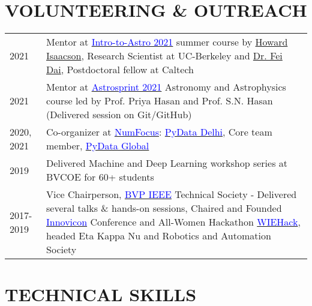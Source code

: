 \documentclass[11pt]{res} %
\begin{document}
\begin{resume}

\section{VOLUNTEERING \& OUTREACH}
\vspace{0.15in}
\begin{table}[h]
\begin{tabular}{p{0.8in} p{5.5in}}
    2021 & Mentor at \href{https://github.com/howardisaacson/Intro-to-Astro-2021}{\textcolor{blue}{Intro-to-Astro 2021}} summer course by \textcolor{blue}{\href{https://astro.berkeley.edu/people/howard-isaacson/}{Howard Isaacson}}, Research Scientist at UC-Berkeley and \textcolor{blue}{\href{https://sites.astro.caltech.edu/~fdai/}{Dr. Fei Dai}}, Postdoctoral fellow at Caltech \\
    
    2021 & Mentor at \href{https://www.astrosprint2021.com/}{\textcolor{blue}{Astrosprint 2021}} Astronomy and Astrophysics course led
    by Prof. Priya Hasan and Prof. S.N. Hasan (Delivered session on Git/GitHub) \\
    
    2020, 2021 & Co-organizer at \href{https://numfocus.org/}{\textcolor{blue}{NumFocus}}: \href{https://pydata.org/}{\textcolor{blue}{PyData Delhi}}, Core team member, \href{https://global.pydata.org}{\textcolor{blue}{PyData Global}} \\
    
    2019 & Delivered Machine and Deep Learning workshop series at BVCOE for 60+ students\\
    
    2017-2019 & Vice Chairperson, \href{https://bvpieee.com/}{\textcolor{blue}{BVP IEEE}} Technical Society - Delivered several talks \& hands-on sessions, Chaired and Founded \href{https://innovicon.bvpieee.com}{\textcolor{blue}{Innovicon}} Conference and All-Women Hackathon \href{https://wiehack.bvpieee.com}{\textcolor{blue}{WIEHack}}, headed Eta Kappa Nu and Robotics and Automation Society
\end{tabular}
\end{table}
\vspace{0.1in}
\hline


\section{TECHNICAL SKILLS}


\end{resume}
\end{document}

